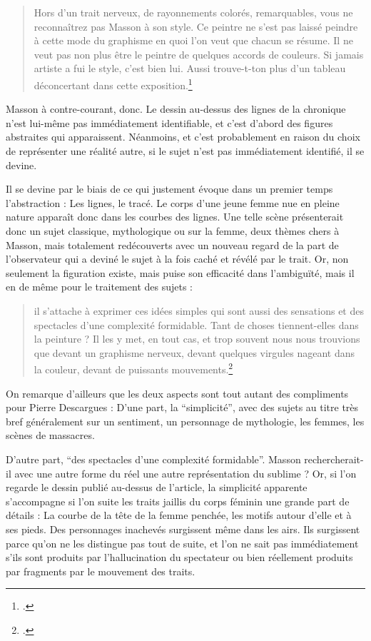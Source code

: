 	\begin{quote}
	 Hors d’un trait nerveux, de rayonnements colorés, remarquables, vous ne reconnaîtrez pas Masson à son style. Ce peintre ne s’est pas laissé peindre à cette mode du graphisme en quoi l’on veut que chacun se résume. Il ne veut pas non plus être le peintre de quelques accords de couleurs. Si jamais artiste a fui le style, c’est bien lui. Aussi trouve-t-ton plus d’un tableau déconcertant dans cette exposition.\footcite{atraversgaleries}\end{quote}
	
	 Masson à contre-courant, donc. Le dessin au-dessus des lignes de la chronique n’est lui-même pas immédiatement identifiable, et c’est d’abord des figures abstraites qui apparaissent. Néanmoins, et c’est probablement en raison du choix de représenter une réalité autre, si le sujet n’est pas immédiatement identifié, il se devine. 

Il se devine par le biais de ce qui justement évoque dans un premier temps l’abstraction : Les lignes, le tracé. Le corps d’une jeune femme nue en pleine nature apparaît donc dans les courbes des lignes. Une telle scène présenterait donc un sujet classique, mythologique ou sur la femme, deux thèmes chers à Masson, mais totalement redécouverts avec un nouveau regard de la part de l’observateur qui a deviné le sujet à la fois caché et révélé par le trait. Or, non seulement la figuration existe, mais puise son efficacité dans l’ambiguïté, mais il en de même pour le traitement des sujets : 

\begin{quote}
il s’attache à exprimer ces idées simples qui sont aussi des sensations et des spectacles d’une complexité formidable. Tant de choses tiennent-elles dans la peinture ? Il les y met, en tout cas, et trop souvent nous nous trouvions que devant un graphisme nerveux, devant quelques virgules nageant dans la couleur, devant de puissants mouvements.\footcite{atraversgaleries}\end{quote}

 
	On remarque d’ailleurs que les deux aspects sont tout autant des compliments pour Pierre Descargues : D’une part, la \enquote{simplicité}, avec des sujets au titre très bref généralement sur un sentiment, un personnage de mythologie, les femmes, les scènes de massacres. 


	D’autre part, \enquote{des spectacles d’une complexité formidable}. Masson rechercherait-il avec une autre forme du réel une autre représentation du sublime ?  Or, si l’on regarde le dessin publié au-dessus de l’article, la simplicité apparente s’accompagne si l’on suite les traits jaillis du corps féminin une grande part de détails : La courbe de la tête de la femme penchée, les motifs autour d’elle et à ses pieds. Des personnages inachevés surgissent même dans les airs. Ils surgissent parce qu’on ne les distingue pas tout de suite, et l’on ne sait pas immédiatement s’ils sont produits par l’hallucination du spectateur ou bien réellement produits par fragments par le mouvement des traits. 

